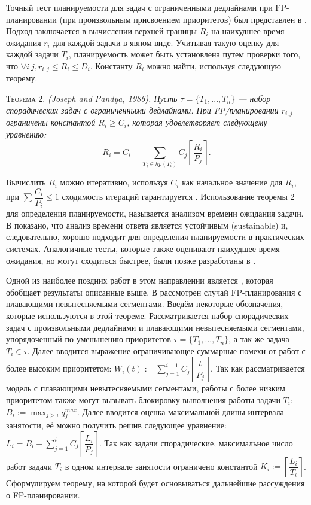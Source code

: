 Точный тест планируемости для задач с ограниченными дедлайнами при FP-планировании (при произвольным присвоением приоритетов) был представлен в \cite{Joseph1986FindingRT}. Подход заключается в вычислении верхней границы $R_i$ на наихудшее время ожидания $r_i$ для каждой задачи в явном виде. Учитывая такую оценку для каждой задачи $T_i$, планируемость может быть установлена путем проверки того, что $\forall i \ j, r_{i,j} \leq R_i \leq D_i$. Константу $R_i$ можно найти, используя следующую теорему.

\textsc{Теорема 2.}
\textit{(Joseph and Pandya, 1986). Пусть $\tau = \{T_1, ... , T_n\}$ --- набор спорадических задач с ограниченными дедлайнами. При FP\-/планировании $r_{i,j}$ ограничены константой $R_i \geq C_i$, которая удовлетворяет следующему уравнению: $$ R_i = C_i + \sum_{T_j \in hp(T_i)} C_j \left \lceil \dfrac{R_i}{P_j} \right \rceil.$$
}

Вычислить $R_i$ можно итеративно, используя $C_i$ как начальное значение для $R_i$, при $\sum_{} \dfrac{C_i}{P_i} \leq 1$ сходимость итераций гарантируется \cite{Joseph1986FindingRT}. Использование теоремы 2 для определения планируемости, называется анализом времени ожидания задачи. В \cite{Baruah2006SustainableSA} показано, что анализ времени ответа является устойчивым (sustainable) и, следовательно, хорошо подходит для определения планируемости в практических системах. Аналогичные тесты, которые также оценивают наихудшее время ожидания, но могут сходиться быстрее, были позже разработаны в \cite{Audsley1991HardRS, Lehoczky1989TheRM}.

Одной из наиболее поздних работ в этом направлении является \cite{Bertogna2011ImprovingFO}, которая обобщает результаты описанные выше. В \cite{Bertogna2011ImprovingFO} рассмотрен случай FP-планирования с плавающими невытесняемыми сегментами. Введём некоторые обозначения, которые используются в этой теореме. Рассматривается набор спорадических задач с произвольными дедлайнами и плавающими невытесняемыми сегментами, упорядоченный по уменьшению приоритетов $\tau = \{T_1, ... , T_n\}$, а так же задача $T_i \in \tau$. Далее вводится выражение ограничивающее суммарные помехи от работ с более высоким приоритетом: $W_i(t) := \sum_{j = 1}^{i-1} C_j \left \lceil \dfrac{t}{P_j} \right \rceil$. Так как рассматривается модель с плавающими невытесняемыми сегментами, работы с более низким приоритетом также могут вызывать блокировку выполнения работы задачи $T_i$: $B_i := \max_{j>i} q_{j}^{max}$. Далее вводится оценка максимальной длины интервала занятости, её можно получить решив следующее уравнение: $L_i = B_i + \sum_{j = 1}^{i} C_j \left \lceil \dfrac{L_i}{P_j} \right \rceil$. Так как задачи спорадические, максимальное число работ задачи $T_i$ в одном интервале занятости ограничено константой $K_i := \left \lceil \dfrac{L_i}{T_i} \right \rceil$. Сформулируем теорему, на которой будет основываться дальнейшие рассуждения о FP-планировании.

